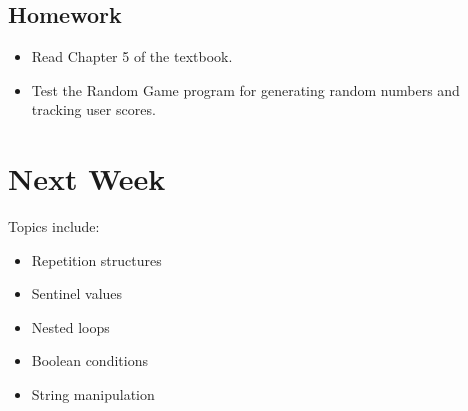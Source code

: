 \documentclass{article}
\begin{document}
\subsection*{Homework}
\begin{itemize}
    \item Read Chapter 5 of the textbook.
    \item Test the Random Game program for generating random numbers and tracking user scores.
\end{itemize}

\section*{Next Week}
Topics include:
\begin{itemize}
    \item Repetition structures
    \item Sentinel values
    \item Nested loops
    \item Boolean conditions
    \item String manipulation
\end{itemize}
\end{document}
